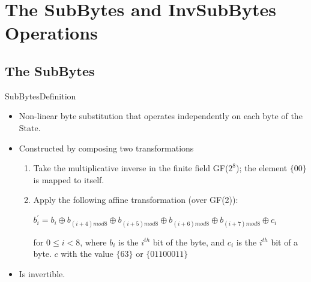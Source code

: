 \section{The SubBytes and InvSubBytes Operations}

\subsection{The SubBytes}

\begin{frame}[t]{SubBytes}{Definition}
	\begin{itemize}
		\item Non-linear byte substitution that operates independently on each byte of the State.
		\item Constructed by composing two transformations
			\begin{enumerate}
				\item Take the multiplicative inverse in the finite field GF($2^8$); the element $\{00\}$ is mapped to itself.
				\item Apply the following affine transformation (over GF(2)): 
				\begin{center}
					$b_i^{'}= b_i \oplus b_{(i+4)mod8} \oplus b_{(i+5)mod8} \oplus b_{(i+6)mod8} \oplus b_{(i+7)mod8} \oplus c_i$
				\end{center}					
				for $0 \leq i < 8$, where $b_i$ is the $i^{th}$ bit of the byte, and $c_i$ is the $i^{th}$ bit of a byte. $c$ with the value $\{63\}$ or $\{01100011\}$
			\end{enumerate}
		\item Is invertible.
	\end{itemize}
	
\end{frame}

